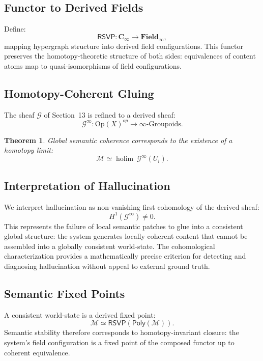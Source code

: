\documentclass[11pt]{article}
\newtheorem{theorem}{Theorem}[section]
\begin{document}
\subsection{Functor to Derived Fields}

Define:
\[
\mathsf{RSVP} :
\mathbf{C}_\infty \to \mathbf{Field}_\infty,
\]
mapping hypergraph structure into derived field configurations.
This functor preserves the homotopy-theoretic structure of both sides:
equivalences of content atoms map to quasi-isomorphisms of field
configurations.

\subsection{Homotopy-Coherent Gluing}

The sheaf $\mathscr{G}$ of Section~13 is refined to a derived sheaf:
\[
\mathscr{G}^\infty : \mathrm{Op}(X)^{op} \to \infty\text{-Groupoids}.
\]

\begin{theorem}
Global semantic coherence corresponds to the existence of a homotopy
limit:
\[
\mathcal{M} \simeq \operatorname{holim}\, \mathscr{G}^\infty(U_i).
\]
\end{theorem}

\subsection{Interpretation of Hallucination}

We interpret hallucination as non-vanishing first cohomology of the derived
sheaf:
\[
H^1(\mathscr{G}^\infty) \neq 0.
\]
This represents the failure of local semantic patches to glue into a
consistent global structure: the system generates locally coherent content
that cannot be assembled into a globally consistent world-state.
The cohomological characterization provides a mathematically precise
criterion for detecting and diagnosing hallucination without appeal to
external ground truth.

\subsection{Semantic Fixed Points}

A consistent world-state is a derived fixed point:
\[
\mathcal{M}
\simeq
\mathsf{RSVP}(\mathsf{Poly}(\mathcal{M})).
\]
Semantic stability therefore corresponds to homotopy-invariant closure:
the system's field configuration is a fixed point of the composed functor
up to coherent equivalence.
\end{document}

